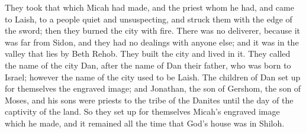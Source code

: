 {They took that which Micah had made, and the priest whom he had, and came to Laish, to a people quiet and unsuspecting, and struck them with the edge of the sword; then they burned the city with fire.
There was no deliverer, because it was far from Sidon, and they had no dealings with anyone else; and it was in the valley that lies by Beth Rehob. They built the city and lived in it.
They called the name of the city Dan, after the name of Dan their father, who was born to Israel; however the name of the city used to be Laish.
The children of Dan set up for themselves the engraved image; and Jonathan, the son of Gershom, the son of Moses, and his sons were priests to the tribe of the Danites until the day of the captivity of the land.
So they set up for themselves Micah’s engraved image which he made, and it remained all the time that God’s house was in Shiloh.

}
